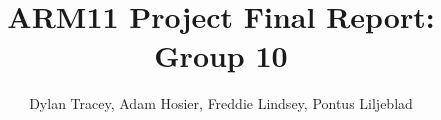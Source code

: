 \title{ARM11 Project Final Report: Group 10}
\author{Dylan Tracey, Adam Hosier, Freddie Lindsey, Pontus Liljeblad}